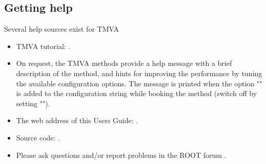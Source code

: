 \subsection{Getting help}

Several help sources exist for TMVA

\begin{itemize}


\item TMVA tutorial: .


\item On request, the TMVA methods provide a help message with a brief description of the
      method, and hints for improving the performance by tuning the available configuration
      options. The message is printed when the option "" is added to the configuration
      string while booking the method (switch off by setting "").

\item The web address of this Users Guide:
      .


\item Source code: .


\item Please ask questions and/or report problems in the ROOT forum .

\end{itemize}

